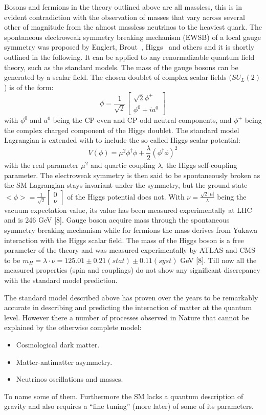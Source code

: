 Bosons and fermions in the theory outlined above are all massless, this is in evident contradiction with
the observation of masses that vary across several other of magnitude from the almost massless neutrinos
to the heaviest quark.
The spontaneous electroweak symmetry breaking mechanism (EWSB) of a local gauge
symmetry was proposed by Englert, Brout~\cite{37}, Higgs~\cite{higgs} and others and it
is shortly outlined in the following. It can be applied to any renormalizable quantum field theory,
such as the standard models. The mass
of the gauge bosons can be generated by a scalar field. The chosen doublet of complex
scalar fields ($SU_L(2)$) is of the form:
\[
  \phi = \frac{1}{\sqrt{2}}\begin{bmatrix}
    \sqrt{2}\phi^+ \\
    \phi^0 + ia^0
  \end{bmatrix}
\]
with $\phi^0$ and $a^0$ being the CP-even and CP-odd neutral components, and $\phi^+$ being the
complex charged component of the Higgs doublet. The standard model Lagrangian is extended with
to include the so-called Higgs scalar potential:
\[
  V(\phi) = \mu^2\phi^{\dagger}\phi + \frac{\lambda}{2}(\phi^{\dagger}\phi)^2
\]
with the real parameter $\mu^2$ and quartic coupling $\lambda$, the Higgs self-coupling parameter.
The electroweak symmetry is then said to be spontaneously broken as the SM Lagrangian
stays invariant under the symmetry, but the ground state $<\phi> = \frac{1}{\sqrt{2}}\begin{bmatrix}0 \\ \nu \end{bmatrix}$
of the Higgs potential does not.
With $\nu = \frac{\sqrt{2}|\mu|}{\lambda}$ being the vacuum expectation value, its value has been
measured experimentally at LHC and is 246 GeV [8].
Gauge boson acquire mass through the spontaneous symmetry breaking mechanism while for fermions
the mass derives from Yukawa interaction with the Higgs scalar field.
The mass of the Higgs boson is a free parameter of the theory and was measured experimentally by ATLAS and CMS to be
$m_H = \lambda\cdot\nu = 125.01\pm 0.21(stat) \pm 0.11 (syst)$ GeV [8].
Till now all the measured properties (spin and couplings) do not show any significant discrepancy with
the standard model prediction.

The standard model described above has proven over the years to be remarkably accurate in describing and
predicting the interaction of matter at the quantum level.
However there a number of processes observed in Nature that cannot be explained by the otherwise complete model:
\begin{itemize}
\item Cosmological dark matter.
\item Matter-antimatter asymmetry.
\item Neutrinos oscillations and masses.
\end{itemize}
To name some of them. Furthermore the SM lacks a quantum description of gravity and also requires
a ``fine tuning'' (more later) of some of its parameters.

